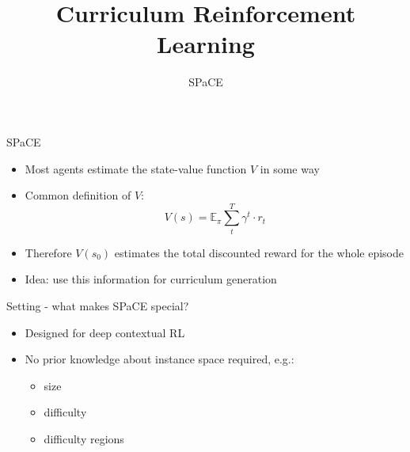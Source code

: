 


\title[Curriculum RL]{Curriculum Reinforcement Learning}
\subtitle{SPaCE}



	
	\maketitle

\begin{frame}[c]{SPaCE~}
	
	\begin{itemize}
		\item Most agents estimate the state-value function $V$ in some way
		\item Common definition of $V$: 
			$$ V(s) = \mathbb{E}_{\pi} \sum_t^T \gamma^t \cdot r_t $$
		\item Therefore $V(s_0)$ estimates the total discounted reward for the whole episode
		\item Idea: use this information for curriculum generation
	\end{itemize}
	
\end{frame}


\begin{frame}[c]{Setting - what makes SPaCE special?}
	
	\begin{itemize}
		\item Designed for deep contextual RL
		\item No prior knowledge about instance space required, e.g.:
		\begin{itemize}
			\item size
			\item difficulty
			\item difficulty regions
		\end{itemize}
	\end{itemize}
	
\end{frame}

